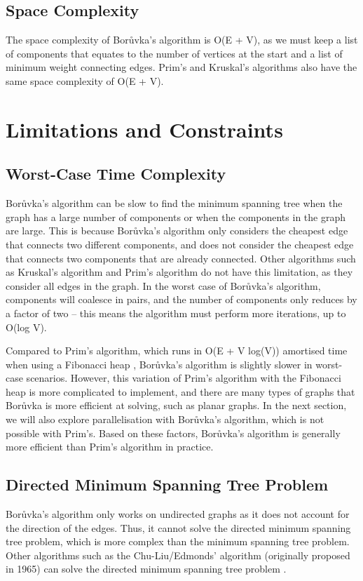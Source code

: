 \documentclass[a4paper, 11pt]{article}
\begin{document}
\subsection{Space Complexity}
The space complexity of Borůvka's algorithm is O(E + V), as we must keep a list of components that equates to the number of vertices at the start and a list of minimum weight connecting edges. Prim's and Kruskal's algorithms also have the same space complexity of O(E + V).

\section{Limitations and Constraints}

\subsection{Worst-Case Time Complexity}
Borůvka's algorithm can be slow to find the minimum spanning tree when the graph has a large number of components or when the components in the graph are large. This is because Borůvka's algorithm only considers the cheapest edge that connects two different components, and does not consider the cheapest edge that connects two components that are already connected. Other algorithms such as Kruskal's algorithm and Prim's algorithm do not have this limitation, as they consider all edges in the graph. In the worst case of Borůvka's algorithm, components will coalesce in pairs, and the number of components only reduces by a factor of two -- this means the algorithm must perform more iterations, up to O(log V). 

Compared to Prim's algorithm, which runs in O(E + V log(V)) amortised time when using a Fibonacci heap \cite{fredman1987fibonacci}, Borůvka's algorithm is slightly slower in worst-case scenarios. However, this variation of Prim's algorithm with the Fibonacci heap is more complicated to implement, and there are many types of graphs that Borůvka is more efficient at solving, such as planar graphs. In the next section, we will also explore parallelisation with Borůvka's algorithm, which is not possible with Prim's. Based on these factors, Borůvka's algorithm is generally more efficient than Prim's algorithm in practice.

\subsection{Directed Minimum Spanning Tree Problem}
Borůvka's algorithm only works on undirected graphs as it does not account for the direction of the edges. Thus, it cannot solve the directed minimum spanning tree problem, which is more complex than the minimum spanning tree problem. Other algorithms such as the Chu-Liu/Edmonds' algorithm (originally proposed in 1965) can solve the directed minimum spanning tree problem \cite{gabow1986efficient}.
\end{document}
